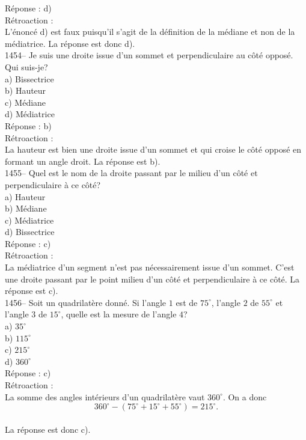 R\'eponse : d)\\

R\'etroaction :\\
L'\'enonc\'e d) est faux puisqu'il s'agit de la d\'efinition de la
m\'ediane et non de la
m\'ediatrice. La r\'eponse est donc d).\\

1454-- Je suis une droite issue d'un sommet et perpendiculaire au
c\^ot\'e
oppos\'e. Qui suis-je?\\
a) Bissectrice\\
b) Hauteur \\
c) M\'ediane\\
d) M\'ediatrice\\

R\'eponse : b)\\

R\'etroaction :\\
La hauteur est bien une droite issue d'un sommet et qui croise le
c\^ot\'e
oppos\'e en formant un angle droit. La r\'eponse est b).\\

1455-- Quel est le nom de la droite passant par le milieu d'un
c\^ot\'e et perpendiculaire \`a ce c\^ot\'e?\\
a) Hauteur\\
b) M\'ediane\\
c) M\'ediatrice\\
d) Bissectrice\\

R\'eponse : c)\\

R\'etroaction :\\
La m\'ediatrice d'un segment n'est pas n\'ecessairement issue d'un
sommet. C'est une droite passant par le point milieu d'un c\^ot\'e
et perpendiculaire \`a ce
c\^ot\'e. La r\'eponse est c).\\

1456-- Soit un quadrilat\`ere donn\'e. Si l'angle $1$ est de
$75^{\circ}$, l'angle $2$ de $55^{\circ}$ et l'angle $3$ de
$15^{\circ}$, quelle est la
mesure de l'angle $4$?\\
a) $35^{\circ}$\\
b) $115^{\circ}$\\
c) $215^{\circ}$\\
d) $360^{\circ}$\\

R\'eponse : c)\\

R\'etroaction :\\
La somme des angles int\'erieurs d'un quadrilat\`ere vaut
$360^{\circ}$. On a donc
$$360^{\circ}-(75^{\circ}+15^{\circ}+55^{\circ})=215^{\circ}.$$\\
La r\'eponse est donc c).\\

